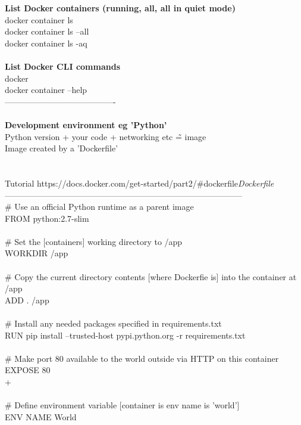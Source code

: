 \documentclass[10pt,a4paper]{article}
\begin{document}
{{{{{{{{{\textbf{List Docker containers (running, all, all in quiet mode)}}{\large \\
docker container ls\\
docker container ls --all\\
docker container ls -aq\\
\\
\textbf{List Docker CLI commands}}{\large \\
docker\\
docker container --help\\
----------------------------------------\\
\\
\textbf{Development environment eg 'Python'}}{\large \\
Python version + your code + networking etc \~= image\\
Image created by a 'Dockerfile'\\
\\
\\
Tutorial https://docs.docker.com/get-started/part2/\#dockerfile}{\large \textit{Dockerfile}}{\large \\
--------------------------------------------------------------------------------------\\
\# Use an official Python runtime as a parent image\\
FROM python:2.7-slim\\
\\
\# Set the [containers] working directory to /app\\
WORKDIR /app\\
\\
\# Copy the current directory contents [where Dockerfie is] into the container at /app\\
ADD . /app\\
\\
\# Install any needed packages specified in requirements.txt\\
RUN pip install --trusted-host pypi.python.org -r requirements.txt\\
\\
\# Make port 80 available to the world outside via HTTP on this container\\
EXPOSE 80\\
+\\
\\
\# Define environment variable [container is env name is 'world']\\
ENV NAME World\\
\\
}}}}}}}}}
\end{document}
